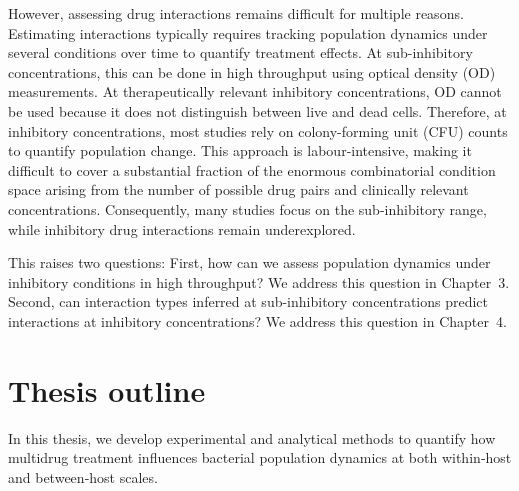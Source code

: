 \documentclass[../main.tex]{subfiles}
\begin{document}
However, assessing drug interactions remains difficult for multiple reasons.
Estimating interactions typically requires tracking population dynamics under several conditions over time to quantify treatment effects.
At sub-inhibitory concentrations, this can be done in high throughput using optical density (OD) measurements.
At therapeutically relevant inhibitory concentrations,  OD cannot be used because it does not distinguish between live and dead cells.
Therefore, at inhibitory concentrations, most studies rely on colony-forming unit (CFU) counts to quantify population change.
This approach is labour-intensive, making it difficult to cover a substantial fraction of the enormous combinatorial condition space arising from the number of possible drug pairs and clinically relevant concentrations.
Consequently, many studies focus on the sub-inhibitory range, while inhibitory drug interactions remain underexplored.

This raises two questions:
First, how can we assess population dynamics under inhibitory conditions in high throughput?
We address this question in Chapter~3.
Second, can interaction types inferred at sub-inhibitory concentrations predict interactions at inhibitory concentrations?
We address this question in Chapter~4.


\section{Thesis outline}

In this thesis, we develop experimental and analytical methods to quantify how multidrug treatment influences bacterial population dynamics at both within‑host and between‑host scales.
\end{document}
